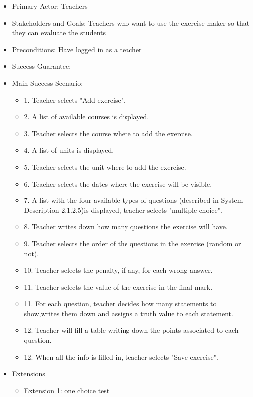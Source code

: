 \documentclass{article}
\begin{document}
\begin{enumerate}
\begin{enumerate}
\begin{enumerate}
			\begin{itemize}
				\item Primary Actor: Teachers
				\item Stakeholders and Goals: Teachers who want to use the exercise maker so that they can evaluate the students
				\item Preconditions: Have logged in as a teacher
				\item Success Guarantee:
				\item Main Success Scenario:
				\begin{itemize}
					\item 1. Teacher selects "Add exercise".
					\item 2. A list of available courses is displayed.
					\item 3. Teacher selects the course where to add the exercise.
					\item 4. A list of units is displayed.
					\item 5. Teacher selects the unit where to add the exercise.
					\item 6. Teacher selects the dates where the exercise will be visible.
					\item 7. A list with the four available types of questions (described in System Description 2.1.2.5)is displayed, teacher selects "multiple choice".
					\item 8. Teacher writes down how many questions the exercise will have.
					\item 9. Teacher selects the order of the questions in the exercise (random or not).
					\item 10. Teacher selects the penalty, if any, for each wrong answer.
					\item 11. Teacher selects the value of the exercise in the final mark.
					\item 11. For each question, teacher decides how many statements to show,writes them down and assigns a truth value to each statement.
					\item 12. Teacher will fill a table writing down the points associated to each question.
					\item 12. When all the info is filled in, teacher selects "Save exercise". 
				\end{itemize}
				\item{Extensions}
				\begin{itemize}
					\item Extension 1: one choice test
					\begin{itemize}

\end{itemize}
\end{itemize}
\end{itemize}
\end{enumerate}
\end{enumerate}
\end{enumerate}
\end{document}
